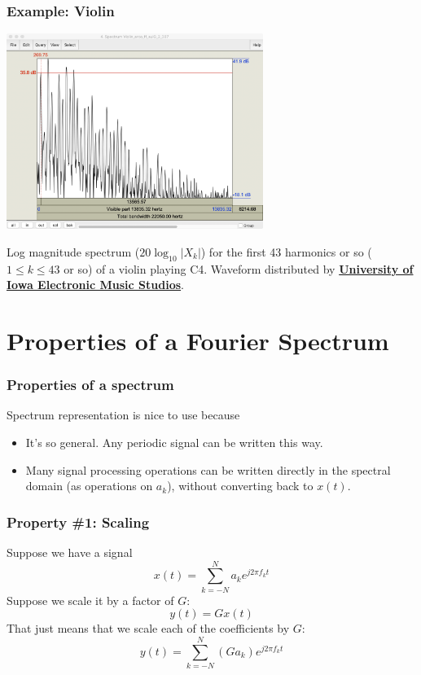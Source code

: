 \documentclass{beamer}
\begin{document}
\begin{frame}
  \frametitle{Example: Violin}

  \centerline{\includegraphics[height=2.5in]{violin_spectrum.png}}
    Log magnitude spectrum ($20\log_{10}|X_k|$) for the first 43 harmonics or so
    ($1\le k\le 43$ or so) of a violin playing C4.
    Waveform distributed by
    \href{http://theremin.music.uiowa.edu/MIS.html}{\bf\color{blue}University of Iowa Electronic Music Studios}.
\end{frame}

\section[Properties]{Properties of a Fourier Spectrum}
\setcounter{subsection}{1}

\begin{frame}
  \frametitle{Properties of a spectrum}

  Spectrum representation is nice to use because
  \begin{itemize}
  \item It's so general.  Any periodic signal can be written this way.
  \item Many signal processing operations can be written directly in
    the spectral domain (as operations on $a_k$), without converting
    back to $x(t)$.
  \end{itemize}
\end{frame}

\begin{frame}
  \frametitle{Property \#1: Scaling}

  Suppose we have a signal
  \[
  x(t) = \sum_{k=-N}^N a_ke^{j2\pi f_kt}
  \]
  Suppose we scale it by a factor of $G$:
  \[
  y(t) = Gx(t)
  \]
  That just means that we scale each of the coefficients by $G$:
  \[
  y(t)  = \sum_{k=-N}^N \left(Ga_k\right) e^{j2\pi f_kt}
  \]
\end{frame}
\end{document}
